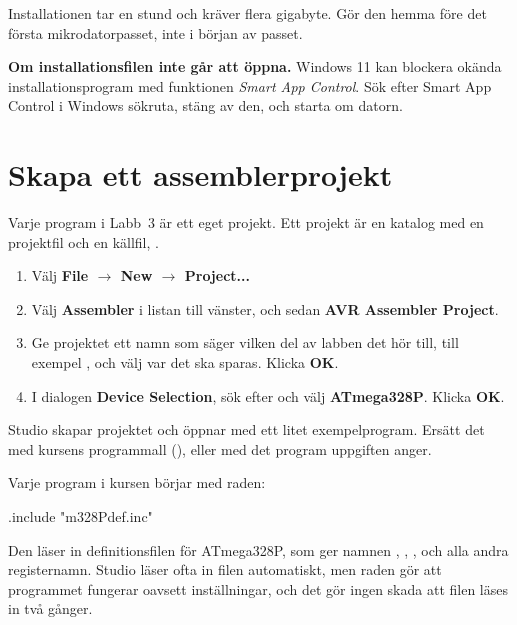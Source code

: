 Installationen tar en stund och kräver flera gigabyte. Gör den hemma före det första
mikrodatorpasset, inte i början av passet.

\begin{aside}
\textbf{Om installationsfilen inte går att öppna.} Windows 11 kan blockera okända
installationsprogram med funktionen \emph{Smart App Control}. Sök efter Smart App Control i Windows
sökruta, stäng av den, och starta om datorn.
\end{aside}

\section{Skapa ett assemblerprojekt}
\label{studio:2}
Varje program i Labb~3 är ett eget projekt. Ett projekt är en katalog med en projektfil och en
källfil, .
\begin{enumerate}
  \item Välj \textbf{File $\rightarrow$ New $\rightarrow$ Project...}
  \item Välj \textbf{Assembler} i listan till vänster, och sedan \textbf{AVR Assembler Project}.
  \item Ge projektet ett namn som säger vilken del av labben det hör till, till exempel
    , och välj var det ska sparas. Klicka \textbf{OK}.
  \item I dialogen \textbf{Device Selection}, sök efter och välj \textbf{ATmega328P}. Klicka
    \textbf{OK}.
\end{enumerate}


Studio skapar projektet och öppnar  med ett litet exempelprogram. Ersätt det med
kursens programmall (), eller med det program uppgiften anger.

Varje program i kursen börjar med raden:

\begin{asmcode}
.include "m328Pdef.inc"
\end{asmcode}

\noindent Den läser in definitionsfilen för ATmega328P, som ger namnen , ,
,  och alla andra registernamn. Studio läser ofta in filen automatiskt, men
raden gör att programmet fungerar oavsett inställningar, och det gör ingen skada att filen läses in
två gånger.

